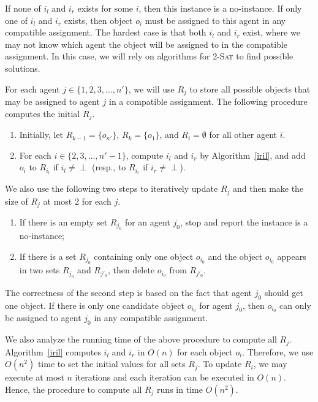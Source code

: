 If none of $i_l$ and $i_r$ exists for some $i$, then this instance is a no-instance.
If only one of $i_l$ and $i_r$ exists, then object $o_i$ must be assigned to this agent in any compatible assignment.
The hardest case is that both $i_l$ and $i_r$ exist, where we may not know which agent the object will be assigned to in the compatible assignment.
In this case, we will rely on algorithms for \textsc{2-Sat} to find possible solutions.


For each agent $j\in\{1,2,3,\dots, n'\}$, we will use $R_j$ to store all possible objects that may be assigned to agent $j$ in a compatible assignment.
The following procedure computes the initial $R_j$.

\begin{enumerate}
\item  Initially, let $R_{k-1}=\{o_{n'}\}$, $R_{k}=\{o_1\}$, and $R_i=\emptyset$ for all other agent $i$.
\item  For each $i \in \{2,3,\dots,n'-1\}$, compute $i_l$ and $i_r$ by Algorithm~\ref{iril}, and add $o_i$ to $R_{i_l}$ if $i_l\neq \perp$ (resp., to $R_{i_r}$ if $i_r\neq \perp$).
\end{enumerate}

We also use the following two steps to iteratively update $R_j$ and then make the size of $R_j$ at most 2 for each $j$.

\begin{enumerate}
\item If there is an empty set $R_{j_0}$ for an agent $j_0$, stop and report the instance is a no-instance;
\item If there is a set $R_{j_0}$ containing only one object $o_{i_0}$ and the object $o_{i_0}$ appears in two sets $R_{j_0}$ and $R_{j'_0}$,
then delete $o_{i_0}$ from $R_{j'_0}$.
\end{enumerate}

The correctness of the second step is based on the fact that agent $j_0$ should get one object.
If there is only one candidate object $o_{i_0}$ for agent $j_0$,  then $o_{i_0}$ can only be assigned to agent $j_0$ in any compatible assignment.

We also analyze the running time of the above procedure to compute all $R_j$.
Algorithm~\ref{iril} computes $i_l$ and $i_r$ in $O(n)$ for each object $o_i$. Therefore, we use $O(n^2)$ time to set the initial values for all sets $R_j$. To update $R_i$, we may execute at most $n$ iterations and each iteration can be executed in $O(n)$. Hence, the procedure to compute all $R_j$ runs in time $O(n^2)$.

